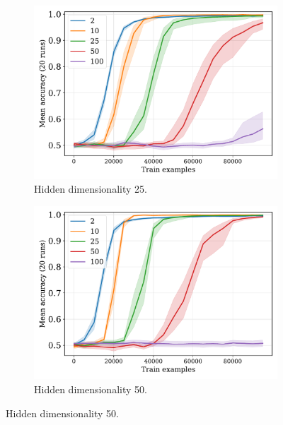 \documentclass{article}
\begin{document}
\begin{figure}[H]
  \begin{subfigure}{0.45\linewidth}
    \includegraphics[width=1\textwidth]{./flatpremack-h2-train_size-embed_dim-hidden_dim=25.pdf}
    \caption{Hidden dimensionality 25.}
  \end{subfigure}
  \hfill
  \begin{subfigure}{0.45\linewidth}
    \includegraphics[width=1\textwidth]{./flatpremack-h2-train_size-embed_dim-hidden_dim=50.pdf}
    \caption{Hidden dimensionality 50.}
  \end{subfigure}

  \vspace{24pt}


\end{figure}
\end{document}

